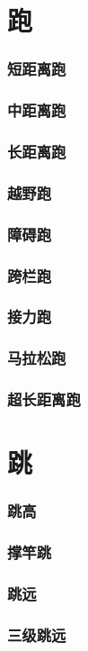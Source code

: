 \documentclass[UTF8]{../../ApplicationUniverse}
\begin{document}
\section{跑}
    \subsubsection{短距离跑}
    \subsubsection{中距离跑}
    \subsubsection{长距离跑}
    \subsubsection{越野跑}
    \subsubsection{障碍跑}
    \subsubsection{跨栏跑}
    \subsubsection{接力跑}
    \subsubsection{马拉松跑}
    \subsubsection{超长距离跑}
\section{跳}
    \subsubsection{跳高}
    \subsubsection{撑竿跳}
    \subsubsection{跳远}
    \subsubsection{三级跳远}
\end{document}
